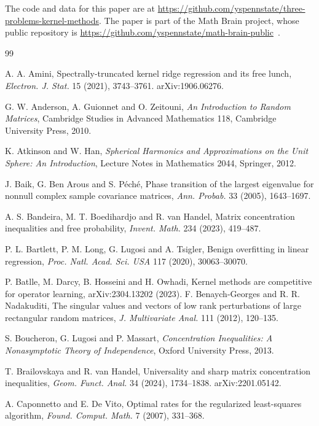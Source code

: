 \documentclass[11pt]{article}
\theoremstyle{definition}
\begin{document}
The code and data for this paper are at \url{https://github.com/yspennstate/three-problems-kernel-methods}. The paper is part of the Math Brain project, whose public repository is \url{https://github.com/yspennstate/math-brain-public}~\cite{MathBrainRepo}.

\begin{thebibliography}{99}

 A. A. Amini, Spectrally-truncated kernel ridge regression and its free lunch,
\emph{Electron. J. Stat.} 15 (2021), 3743--3761. arXiv:1906.06276.

 G. W. Anderson, A. Guionnet and O. Zeitouni, \emph{An Introduction to Random
Matrices}, Cambridge Studies in Advanced Mathematics 118, Cambridge University Press, 2010.

 K. Atkinson and W. Han, \emph{Spherical Harmonics and Approximations on the
Unit Sphere: An Introduction}, Lecture Notes in Mathematics 2044, Springer, 2012.

 J. Baik, G. Ben Arous and S. P\'ech\'e, Phase transition of the largest eigenvalue
for nonnull complex sample covariance matrices, \emph{Ann. Probab.} 33 (2005), 1643--1697.

 A. S. Bandeira, M. T. Boedihardjo and R. van Handel, Matrix concentration
inequalities and free probability, \emph{Invent. Math.} 234 (2023), 419--487.

 P. L. Bartlett, P. M. Long, G. Lugosi and A. Tsigler, Benign overfitting in
linear regression, \emph{Proc. Natl. Acad. Sci. USA} 117 (2020), 30063--30070.


 P. Batlle, M. Darcy, B. Hosseini and H. Owhadi, Kernel methods are competitive for operator learning, arXiv:2304.13202 (2023).
 F. Benaych-Georges and R. R. Nadakuditi, The singular values and vectors of low rank
perturbations of large rectangular random matrices, \emph{J. Multivariate Anal.} 111 (2012),
120--135.

 S. Boucheron, G. Lugosi and P. Massart, \emph{Concentration Inequalities: A
Nonasymptotic Theory of Independence}, Oxford University Press, 2013.

 T. Brailovskaya and R. van Handel, Universality and sharp matrix concentration
inequalities, \emph{Geom. Funct. Anal.} 34 (2024), 1734--1838. arXiv:2201.05142.

 A. Caponnetto and E. De Vito, Optimal rates for the regularized
least-squares algorithm, \emph{Found. Comput. Math.} 7 (2007), 331--368.



\end{thebibliography}
\end{document}
